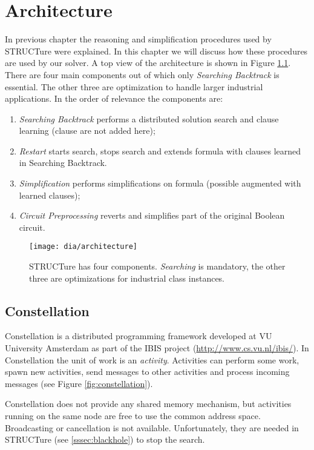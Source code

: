 \chapter{Architecture}
\label{chap:architecture}

In previous chapter the reasoning and simplification procedures
used by STRUCTure were explained. In this chapter we will discuss
how these procedures are used by our solver.  A top view of the
architecture is shown in Figure \ref{fig:architecture}. There are
four main components out of which only \emph{Searching Backtrack}
is essential.  The other three are optimization to handle larger
industrial applications. In the order of relevance the components
are:

\begin{enumerate}
  \item \emph{Searching Backtrack} performs a distributed solution search
  and clause learning (clause are not added here);
  \item \emph{Restart} starts search, stops search and extends
  formula with clauses learned in Searching Backtrack.
  \item \emph{Simplification} performs simplifications on formula (possible
  augmented with learned clauses);
  \item \emph{Circuit Preprocessing} reverts and simplifies 
  part of the original Boolean circuit.
\end{enumerate}

\begin{figure}
  \centering
  \texttt{[image: dia/architecture]}
  \caption{STRUCTure has four components. \emph{Searching}
  is mandatory, the other three are optimizations
  for industrial class instances.}
  \label{fig:architecture}
\end{figure}


\section{Constellation}
\label{sec:constellation}

Constellation is a distributed programming framework developed at
VU University Amsterdam \cite{mine:constellation} as part of the
IBIS project (\url{http://www.cs.vu.nl/ibis/}).  In Constellation
the unit of work is an \emph{activity}. Activities can perform some work,
spawn new activities, send messages to other activities and process
incoming messages (see Figure \ref{fig:constellation}).

Constellation does not provide any shared memory mechanism,
but activities running on the same node are free to use the
common address space. Broadcasting or cancellation is not
available. Unfortunately, they are needed in STRUCTure (see
\ref{sssec:blackhole}) to stop the search.

